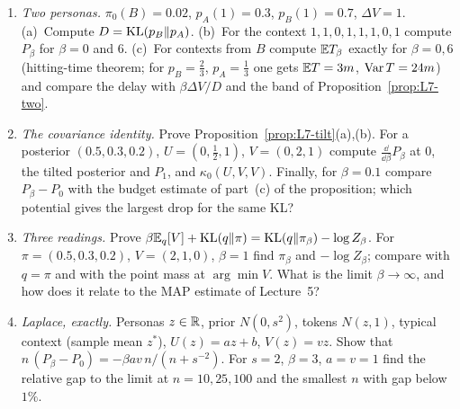 \begin{exercise}
\begin{enumerate}
  \item \emph{Two personas.} $\pi_0(B)=0.02$, $p_A(1)=0.3$, $p_B(1)=0.7$, $\Delta V=1$. (a)~Compute $D=\operatorname{KL}(p_B\|p_A)$. (b)~For the context $1,1,0,1,1,1,0,1$ compute $P_\beta$ for $\beta=0$ and $6$. (c)~For contexts from $B$ compute $\mathbb{E} T_\beta$ exactly for $\beta=0,6$ (hitting-time theorem; for $p_B=\frac23$, $p_A=\frac13$ one gets $\mathbb{E} T=3m$, $\operatorname{Var} T=24m$) and compare the delay with $\beta\Delta V/D$ and the band of Proposition~\ref{prop:L7-two}.
  \item \emph{The covariance identity.} Prove Proposition~\ref{prop:L7-tilt}(a),(b). For a posterior $(0.5,0.3,0.2)$, $U=(0,\frac12,1)$, $V=(0,2,1)$ compute $\frac{\dd}{\dd\beta}P_\beta$ at $0$, the tilted posterior and $P_1$, and $\kappa_0(U,V,V)$. Finally, for $\beta=0.1$ compare $P_\beta-P_0$ with the budget estimate of part~(c) of the proposition; which potential gives the largest drop for the same KL?
  \item \emph{Three readings.} Prove $\beta\mathbb{E}_q[V]+\operatorname{KL}(q\|\pi)=\operatorname{KL}(q\|\pi_\beta)-\log Z_\beta$. For $\pi=(0.5,0.3,0.2)$, $V=(2,1,0)$, $\beta=1$ find $\pi_\beta$ and $-\log Z_\beta$; compare with $q=\pi$ and with the point mass at $\arg\min V$. What is the limit $\beta\to\infty$, and how does it relate to the MAP estimate of Lecture~5?
  \item \emph{Laplace, exactly.} Personas $z\in\mathbb{R}$, prior $N(0,s^2)$, tokens $N(z,1)$, typical context (sample mean $z^*$), $U(z)=az+b$, $V(z)=vz$. Show that $n\,(P_\beta-P_0)=-\beta av\,n/(n+s^{-2})$. For $s=2$, $\beta=3$, $a=v=1$ find the relative gap to the limit at $n=10,25,100$ and the smallest $n$ with gap below $1\%$.
\end{enumerate}
\end{exercise}

